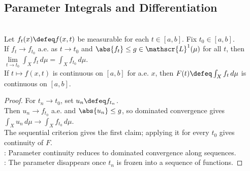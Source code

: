 \subsection{Parameter Integrals and Differentiation}

\begin{corollary} \label{cor:dominated-parameter-continuity} \\
Let $f_t(x)\defeq f(x,t)$ be measurable for each $t\in[a,b]$. Fix $t_0\in[a,b]$.\\
If $f_t\to f_{t_0}$ a.e. as $t\to t_0$ and $\abs{f_t}\leq g\in\mathscr{L}^1(\mu)$ for all $t$, then $\lim\limits_{t\to t_0}\int_X f_t\,d\mu=\int_X f_{t_0}\,d\mu$.\\
If $t\mapsto f(x,t)$ is continuous on $[a,b]$ for a.e. $x$, then $F(t)\defeq\int_X f_t\,d\mu$ is continuous on $[a,b]$.
\begin{proof}
For $t_n\to t_0$, set $u_n\defeq f_{t_n}$.\\
Then $u_n\to f_{t_0}$ a.e. and $\abs{u_n}\leq g$, so dominated convergence gives $\int_Xu_n\,d\mu\to\int_Xf_{t_0}\,d\mu$.\\
The sequential criterion gives the first claim; applying it for every $t_0$ gives continuity of $F$.\\
: Parameter continuity reduces to dominated convergence along sequences.\\
: The parameter disappears once $t_n$ is frozen into a sequence of functions.
\end{proof}
\end{corollary}

